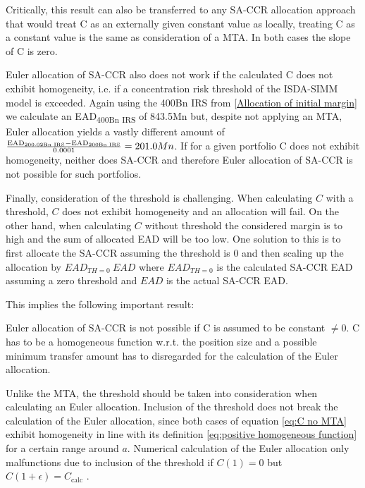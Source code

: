 \documentclass[../Thesis_AHoecherl.tex]{subfiles}
\begin{document}
    Critically, this result can also be transferred to any SA-CCR allocation approach that would treat C as an externally given constant value as locally, treating C as a constant value is the same as consideration of a \gls{MTA}. 
    In both cases the slope of C is zero. 
    
    Euler allocation of SA-CCR also does not work if the calculated C does not exhibit homogeneity, i.e. if a concentration risk threshold of the ISDA-SIMM model is exceeded. Again using the 400Bn IRS from \ref{Allocation of initial margin} we calculate an EAD\textsubscript{400Bn IRS} of 843.5Mn but, despite not applying an MTA, Euler allocation yields a vastly different amount of $ \frac{\text{EAD\textsubscript{200.02Bn IRS}}-\text{EAD\textsubscript{200Bn IRS}}}{0.0001} = 201.0Mn $. If for a given portfolio C does not exhibit homogeneity, neither does SA-CCR and therefore Euler allocation of SA-CCR is not possible for such portfolios.

    Finally, consideration of the threshold is challenging. When calculating $C$ with a threshold, $C$ does not exhibit homogeneity and an allocation will fail. On the other hand, when calculating $C$ without threshold the considered margin is to high and the sum of allocated EAD will be too low.
    One solution to this is to first allocate the SA-CCR assuming the threshold is 0 and then scaling up the allocation by $EAD_{TH = 0} \ EAD$ where $EAD_{TH = 0}$ is the calculated SA-CCR EAD assuming a zero threshold and $EAD$ is the actual SA-CCR EAD.


    This implies the following important result:
    
    Euler allocation of SA-CCR is not possible if C is assumed to be constant $\neq 0$. C has to be a homogeneous function w.r.t. the position size and a possible minimum transfer amount has to disregarded for the calculation of the Euler allocation.

    Unlike the \gls{MTA}, the threshold should be taken into consideration when calculating an Euler allocation. 
    Inclusion of the threshold does not break the calculation of the Euler allocation, since both cases of equation \ref{eq:C no MTA} exhibit homogeneity in line with its definition \ref{eq:positive homogeneous function} for a certain range around $a$. 
    Numerical calculation of the Euler allocation only malfunctions due to inclusion of the threshold if $C(1) = 0$ but $C(1+\epsilon) = C_{\text{calc}}$ .
\end{document}
